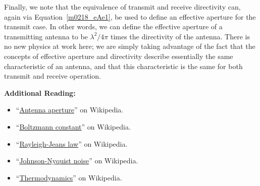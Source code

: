 Finally, we note that the equivalence of transmit and receive directivity can, again via Equation~\ref{m0218_eAe1}, be used to define an effective aperture for the transmit case.
In other words, we can define the effective aperture of a transmitting antenna to be $\lambda^2/4\pi$ times the directivity of the antenna.
There is no new physics at work here; we are simply taking advantage of the fact that the concepts of effective aperture and directivity describe essentially the same characteristic of an antenna, and that this characteristic is the same for both transmit and receive operation.


{\bf Additional Reading:}
\begin{itemize}
\item ``\href{https://en.wikipedia.org/wiki/Antenna_aperture}{Antenna aperture}'' on Wikipedia.
\item ``\href{https://en.wikipedia.org/wiki/Boltzmann_constant}{Boltzmann constant}'' on Wikipedia.
\item ``\href{https://en.wikipedia.org/wiki/Rayleigh%E2%80%93Jeans_law}{Rayleigh-Jeans law}'' on Wikipedia.
\item ``\href{https://en.wikipedia.org/wiki/Johnson%E2%80%93Nyquist_noise}{Johnson-Nyquist noise}'' on Wikipedia.
\item ``\href{https://en.wikipedia.org/wiki/Thermodynamics}{Thermodynamics}'' on Wikipedia.
\end{itemize}



